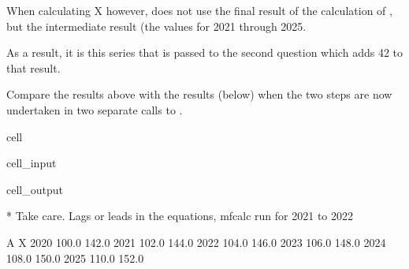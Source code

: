 \documentclass[letterpaper,10pt,english]{jupyterBook}
\begin{document}
\sphinxAtStartPar
When calculating X however,  does not use the final result of the calculation of , but the intermediate result (the values for 2021 through 2025.

\sphinxAtStartPar
As a result, it is this series that is passed to the second question which adds 42 to that result.

\sphinxAtStartPar
{}

\sphinxAtStartPar
Compare the results above with the results (below) when the two steps are now undertaken in two separate calls to .

\begin{sphinxuseclass}{cell}\begin{sphinxVerbatimInput}

\begin{sphinxuseclass}{cell_input}
\begin{sphinxVerbatim}[commandchars=\\\{\}]
  

  
\end{sphinxVerbatim}

\end{sphinxuseclass}\end{sphinxVerbatimInput}
\begin{sphinxVerbatimOutput}

\begin{sphinxuseclass}{cell_output}
\begin{sphinxVerbatim}[commandchars=\\\{\}]
* Take care. Lags or leads in the equations, mfcalc run for 2021 to 2022
\end{sphinxVerbatim}

\begin{sphinxVerbatim}[commandchars=\\\{\}]
          A      X
2020  100.0  142.0
2021  102.0  144.0
2022  104.0  146.0
2023  106.0  148.0
2024  108.0  150.0
2025  110.0  152.0
\end{sphinxVerbatim}

\end{sphinxuseclass}\end{sphinxVerbatimOutput}

\end{sphinxuseclass}
\end{document}
